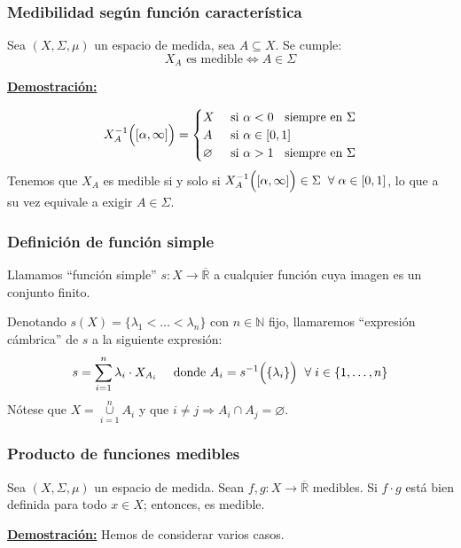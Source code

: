 \documentclass[12pt,a4paper]{article}
\newcommand{\R}{\mathbb{R}}
\newcommand{\N}{\mathbb{N}}
\newcommand{\smallcup}{\mathop{\cup}\limits}
\newcounter{unit}[section]
\newcounter{chapter}[unit]
\renewcommand{\theunit}{\arabic{unit}}
\renewcommand{\thechapter}{\arabic{chapter}}
\renewcommand{\thesubsubsection}{\theunit.\thechapter.\arabic{subsubsection}}
\newcommand{\result}[1]{%
  \subsubsection{#1}%
  \label{result:\thesubsubsection}
}
\newcommand{\dem}{
    \noindent \underline{\textbf{Demostración:}}
}
\begin{document}
\newpage
\result{Medibilidad según función característica}
\hspace{3mm} Sea $(X, \Sigma, \mu)$ un espacio de medida, sea $A \subseteq X$. Se cumple:
$$ X_A \text{ es medible} \iff A \in \Sigma$$

\vspace{2mm} \dem
\begin{align*}
    X_A^{-1}\Big([\alpha, \infty]\Big) = 
    \begin{cases}
        X &\text{ si } \alpha < 0  \hspace{2mm} \text{ siempre en } \Sigma \\
        A &\text{ si } \alpha \in [0,1] \\
        \varnothing &\text{ si } \alpha > 1 \hspace{2mm} \text{ siempre en } \Sigma 
    \end{cases}
\end{align*}
Tenemos que $X_A$ es medible si y solo si $X_A^{-1}\Big([\alpha, \infty]\Big) \in \Sigma \hspace{2mm} \forall \hspace{1mm} \alpha \in [0,1]$, lo que a su vez equivale a exigir $A \in \Sigma$.

\vspace{6mm}
\result{Definición de función simple}
\hspace{3mm} Llamamos ``función simple'' $s : X \longrightarrow \overline{\R}$ a cualquier función cuya imagen es un conjunto finito.

\vspace{2mm} Denotando $s(X) = \{\lambda_1 < \ldots < \lambda_n\}$ con $n \in \N$ fijo, llamaremos ``expresión cámbrica'' de $s$ a la siguiente expresión:
\begin{align*}
    s = \sum_{i=1}^n \lambda_i \cdot X_{A_i} && \text{ donde } A_i = s^{-1}\Big(\{\lambda_i\}\Big) \hspace{2mm} \forall \hspace{1mm} i \in \{1,\ldots,n\}
\end{align*}
Nótese que $X = \smallcup_{i=1}^n A_i$ y que $i \neq j \Rightarrow A_i \cap A_j = \varnothing$.

\newpage
\result{Producto de funciones medibles}
\hspace{3mm} Sea $(X, \Sigma, \mu)$ un espacio de medida. Sean $f,g : X \longrightarrow \overline{\R}$ medibles. Si $f \cdot g$ está bien definida para todo $x \in X$; entonces, es medible.

\vspace{2mm} \dem Hemos de considerar varios casos.
\end{document}
